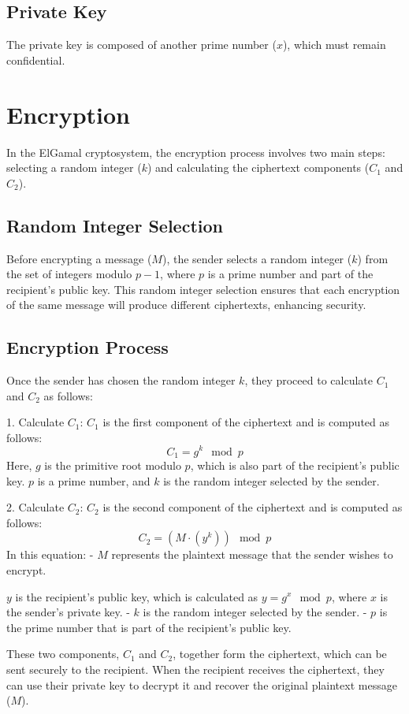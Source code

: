 \documentclass{article}
\begin{document}
\subsection*{Private Key}
The private key is composed of another prime number ($x$), which must remain confidential.

\section*{Encryption}
In the ElGamal cryptosystem, the encryption process involves two main steps: selecting a random integer ($k$) and calculating the ciphertext components ($C_1$ and $C_2$).

\subsection*{Random Integer Selection}
Before encrypting a message ($M$), the sender selects a random integer ($k$) from the set of integers modulo $p-1$, where $p$ is a prime number and part of the recipient's public key. This random integer selection ensures that each encryption of the same message will produce different ciphertexts, enhancing security.

\subsection*{Encryption Process}
Once the sender has chosen the random integer $k$, they proceed to calculate $C_1$ and $C_2$ as follows:

1. Calculate $C_1$: $C_1$ is the first component of the ciphertext and is computed as follows:
\[
C_1 = g^k \mod p
\]
Here, $g$ is the primitive root modulo $p$, which is also part of the recipient's public key. $p$ is a prime number, and $k$ is the random integer selected by the sender.

2. Calculate $C_2$: $C_2$ is the second component of the ciphertext and is computed as follows:
\[
C_2 = (M \cdot (y^k)) \mod p
\]
In this equation:
- $M$ represents the plaintext message that the sender wishes to encrypt.

$y$ is the recipient's public key, which is calculated as $y = g^x \mod p$, where $x$ is the sender's private key.
- $k$ is the random integer selected by the sender.
- $p$ is the prime number that is part of the recipient's public key.

These two components, $C_1$ and $C_2$, together form the ciphertext, which can be sent securely to the recipient. When the recipient receives the ciphertext, they can use their private key to decrypt it and recover the original plaintext message ($M$).
\end{document}
